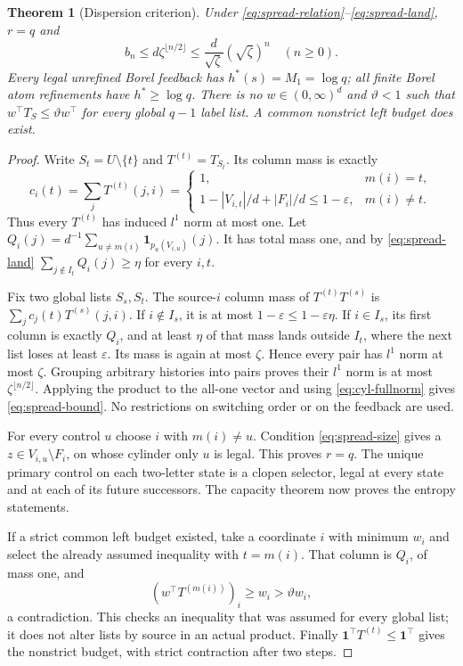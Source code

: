 \documentclass[11pt,reqno]{amsart}
\numberwithin{equation}{section}
\newtheorem{theorem}{Theorem}[section]
\theoremstyle{definition}
\newcommand{\one}{\mathbf 1}
\newcommand{\eps}{\varepsilon}
\begin{document}
\begin{theorem}[Dispersion criterion]\label{thm:spread}
Under \eqref{eq:spread-relation}--\eqref{eq:spread-land}, $r=q$ and
\begin{equation}\label{eq:spread-bound}
 b_n\le d\zeta^{\lfloor n/2\rfloor}
 \le\frac d{\sqrt\zeta}(\sqrt\zeta)^n\quad(n\ge0).
\end{equation}
Every legal unrefined Borel feedback has $h^*(s)=M_1=\log q$;
all finite Borel atom refinements have $h^*\ge\log q$.
There is no $w\in(0,\infty)^d$ and $\vartheta<1$ such that
$w^\top T_S\le\vartheta w^\top$ for every global
$q-1$ label list. A common nonstrict left budget does exist.
\end{theorem}
\begin{proof}
Write $S_t=U\setminus\{t\}$ and $T^{(t)}=T_{S_t}$.
Its column mass is exactly
\[
 c_i(t)=\sum_jT^{(t)}(j,i)=
 \begin{cases}
 1,&m(i)=t,\\
 1-|V_{i,t}|/d+|F_i|/d\le1-\eps,&m(i)\ne t.
 \end{cases}
\]
Thus every $T^{(t)}$ has induced $l^1$ norm at most one.
Let $Q_i(j)=d^{-1}\sum_{u\ne m(i)}\one_{p_u(V_{i,u})}(j)$.
It has total mass one, and by \eqref{eq:spread-land}
$\sum_{j\notin I_t}Q_i(j)\ge\eta$ for every $i,t$.

Fix two global lists $S_s,S_t$. The source-$i$ column mass of
$T^{(t)}T^{(s)}$ is $\sum_jc_j(t)T^{(s)}(j,i)$.
If $i\notin I_s$, it is at most $1-\eps\le1-\eps\eta$.
If $i\in I_s$, its first column is exactly $Q_i$, and at least
$\eta$ of that mass lands outside $I_t$, where the next list loses
at least $\eps$. Its mass is again at most $\zeta$.
Hence every pair has $l^1$ norm at most $\zeta$.
Grouping arbitrary histories into pairs proves their $l^1$ norm
is at most $\zeta^{\lfloor n/2\rfloor}$. Applying the product
to the all-one vector and using \eqref{eq:cyl-fullnorm} gives
\eqref{eq:spread-bound}. No restrictions on switching order or
on the feedback are used.

For every control $u$ choose $i$ with $m(i)\ne u$. Condition
\eqref{eq:spread-size} gives a $z\in V_{i,u}\setminus F_i$,
on whose cylinder only $u$ is legal. This proves $r=q$.
The unique primary control on each two-letter state is a clopen
selector, legal at every state and at each of its future successors.
The capacity theorem now proves the entropy statements.

If a strict common left budget existed, take a coordinate $i$ with
minimum $w_i$ and select the already assumed inequality with
$t=m(i)$. That column is $Q_i$, of mass one, and
\[
 (w^\top T^{(m(i))})_i\ge w_i>
 \vartheta w_i,
\]
a contradiction. This checks an inequality that was assumed for
every global list; it does not alter lists by source in an actual
product. Finally $\one^\top T^{(t)}\le\one^\top$ gives the
nonstrict budget, with strict contraction after two steps.
\end{proof}
\end{document}
